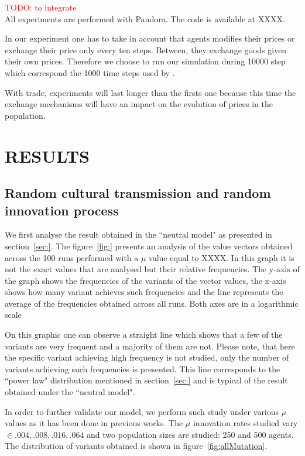 \documentclass{wscpaperproc}
\newcommand{\memo}[2]{\textcolor{#1}{#2}}
\newcommand{\todo}[1]{\memo{red}{TODO: #1\\}}
\begin{document}
\todo{to integrate}
All experiments are performed with Pandora. The code is available at XXXX.

In our experiment one has to take in account that agents modifies their prices or exchange their price only every ten steps. Between, they exchange goods given their own prices. Therefore we choose to run our simulation during 10000 step which correspond the 1000 time steps used by \cite{bentley_random_2004,mesoudi_random_2009}.

With trade, experiments will last longer than the firsts one because this time the exchange mechanisms will have an impact on the evolution of prices in the population. 


\section{RESULTS}
\subsection{Random cultural transmission and random innovation process}

We first analyse the result obtained in the ``neutral model" as presented in section~\ref{sec:}. The figure~\ref{fig:} presents an analysis of the value vectors obtained across the 100 runs performed with a $\mu$ value equal to XXXX. In this graph it is not the exact values that are analysed but their relative frequencies. The y-axis of the graph shows the frequencies of the variants of the vector values, the x-axis shows how many variant achieves such frequencies and the line represents the average of the frequencies obtained across all runs. Both axes are in a logarithmic scale

On this graphic one can observe a straight line which shows that a few of the variants are very frequent and a majority of them are not. Please note, that here the specific variant achieving high frequency is not studied, only the number of variants achieving such frequencies is presented. This line corresponds to the ``power law" distribution mentioned in section~\ref{sec:} and is typical of the result obtained under the ``neutral model". 

In order to further validate our model, we perform such study under various $\mu$ values as it has been done in previous works. The $\mu$ innovation rates studied vary $\in {.004,.008,.016,.064}$ and two population sizes are studied: 250 and 500 agents. The distribution of variants obtained is shown in figure~\ref{fig:allMutation}.
\end{document}
